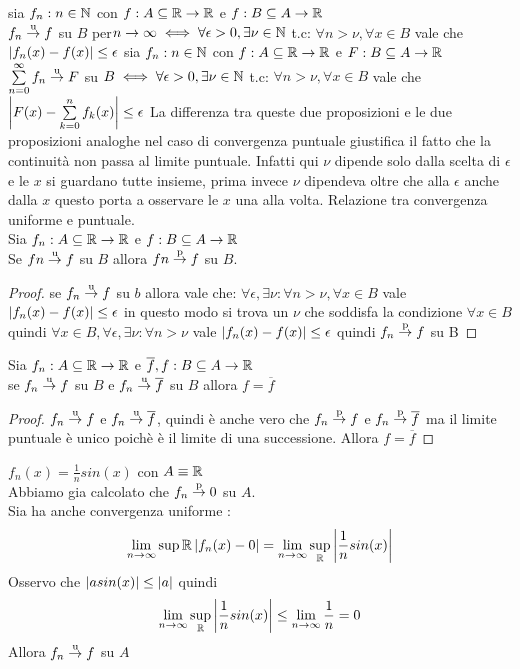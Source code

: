 \proposition
sia $f_n:n\in\mathbb{N}$ con $f:A\subseteq \mathbb{R}\to \mathbb{R}$ e $f:B\subseteq A \to  \mathbb{R}$\\
$f_n \overset{\text{u}}{\to} f$ su $B$ per$n\to\infty \iff \forall\epsilon >0, \exists\nu\in\mathbb{N}$  t.c: $\forall n>\nu, \forall x\in B$ vale che $\left|f_n(x)-f(x)\right| \leq \epsilon$
\proposition
sia $f_n:n\in\mathbb{N}$ con $f:A\subseteq \mathbb{R}\to \mathbb{R}$ e $F:B\subseteq A \to  \mathbb{R}$\\
$\sum\limits_{n=0}^{\infty}f_n \overset{\text{u}}{\to} F$ su $B\iff \forall\epsilon >0, \exists\nu\in\mathbb{N}$  t.c: $\forall n>\nu, \forall x\in B$ vale che $\left|F(x)-\sum\limits_{k=0}^{n}f_k(x)\right| \leq \epsilon$
\observation
La differenza tra queste due proposizioni e le due proposizioni analoghe nel caso di convergenza puntuale giustifica il fatto che la continuità non passa al limite puntuale. Infatti qui $\nu$ dipende solo dalla scelta di $\epsilon$ e le $x$ si guardano tutte insieme, prima invece $\nu$ dipendeva oltre che alla $\epsilon$ anche dalla $x$ questo porta a osservare le $x$ una alla volta.
\proposition Relazione tra convergenza uniforme e puntuale.\\
Sia $f_n:A\subseteq \mathbb{R}\to \mathbb{R}$ e $f:B\subseteq A\to \mathbb{R}$\\
Se $fn \overset{\text{u}}{\to} f$ su $B$ allora $fn \overset{\text{p}}{\to} f$ su $B$.
\begin{proof}
	se $f_n \overset{\text{u}}{\to} f$ su $b$ allora vale che:
	$\forall\epsilon, \exists\nu : \forall n>\nu, \forall x\in B $ vale $\left|f_n(x)-f(x)\right| \leq \epsilon$ in questo modo si trova un $\nu$ che soddisfa la condizione $\forall x \in B$ quindi $\forall x\in B, \forall\epsilon, \exists\nu : \forall n>\nu $ vale $\left|f_n(x)-f(x)\right| \leq \epsilon$ quindi $f_n \overset{\text{p}}{\to} f$ su B
\end{proof}
\proposition
Sia $f_n:A\subseteq \mathbb{R}\to \mathbb{R}$ e $\overline{f},f:B\subseteq A\to \mathbb{R}$\\
se $f_n \overset{\text{u}}{\to} f$ su $B$ e $f_n \overset{\text{u}}{\to} \overline{f}$ su $B$ allora $f=\overline{f}$
\begin{proof}
	$f_n \overset{\text{u}}{\to} f$ e $f_n \overset{\text{u}}{\to} \overline{f}$, quindi è anche vero che $f_n \overset{\text{p}}{\to} f$ e $f_n \overset{\text{p}}{\to} \overline{f}$ ma il limite puntuale è unico poichè è il limite di una successione. Allora $f=\overline{f}$
\end{proof}
\example
$f_n(x)=\frac{1}{n}sin(x)$ con $A\equiv \mathbb{R}$\\
Abbiamo gia calcolato che $f_n \overset{\text{p}}{\to} 0$ su $A$.\\
Sia ha anche convergenza uniforme :
\[\lim\limits_{n\to\infty}\sup{ \mathbb{R}}\left|f_n(x)-0\right| = \lim\limits_{n\to\infty}\sup\limits_{ \mathbb{R}}\left|\frac{1}{n}sin(x)\right|\]
Osservo che $\left|asin(x)\right| \leq \left|a\right|$ quindi
\[\lim\limits_{n\to\infty}\sup\limits_{ \mathbb{R}}\left|\frac{1}{n}sin(x)\right| \leq \lim\limits_{n\to\infty}\frac{1}{n}=0\]
Allora $f_n \overset{\text{u}}{\to} f$ su $A$

